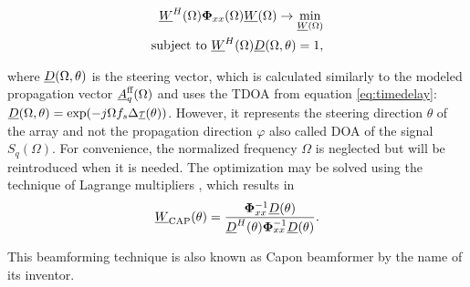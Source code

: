 \begin{equation}
\begin{split}
\underline{W}^H(\Omega) \mathbf{\Phi}_{xx}(\Omega)\underline{W}(\Omega) \rightarrow \min_{\underline{W}(\Omega)} \\
\text{subject to } \underline{W}^H(\Omega) \underline{D}(\Omega,\theta) = 1,
\end{split}
\end{equation}

where $\underline{D}(\Omega,\theta)$ is the steering vector, which is calculated similarly to the modeled propagation vector $\underline{A}_q^\text{ff}(\Omega)$ and uses the \ac{TDOA} from equation \ref{eq:timedelay}: $\underline{D}(\Omega,\theta) = \exp(-j\Omega f_s \Delta \underline{\tau}(\theta))$. However, it represents the steering direction $\theta$ of the array and not the propagation direction $\varphi$ also called \ac{DOA} of the signal $S_q(\Omega)$. For convenience, the normalized frequency $\Omega$ is neglected but will be reintroduced when it is needed. The optimization may be solved using the technique of Lagrange multipliers \cite[Section~2,~Chapter~4]{lagrange}\cite[Chapter~6.2.5.6]{bronstein}, which results in
\begin{equation}
\underline{W}_\text{CAP}(\theta) = \frac{\mathbf{\Phi}_{xx}^{-1} \underline{D}(\theta) } { \underline{D}^H(\theta) \mathbf{\Phi}_{xx}^{-1} \underline{D}(\theta) }.
\label{eq:w_capon}
\end{equation}

This beamforming technique is also known as Capon beamformer by the name of its inventor.
\cite{Capon1969,krim1996two}


